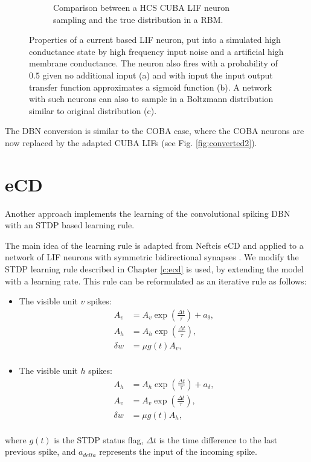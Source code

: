 \begin{figure}
\begin{subfigure}[t]{.5\textwidth}
  		\caption{Comparison between a HCS CUBA LIF neuron sampling and the true distribution in a RBM.}
  		\label{fig:sub2}
	\end{subfigure}
	\caption[Properties of a current based LIF neuron in a high conductance state.]{Properties of a current based LIF neuron, put into a simulated high conductance state by high frequency input noise and a artificial high membrane conductance. The neuron also fires with a probability of $0.5$ given no additional input (a) and with input the input output transfer function approximates a sigmoid function (b). A network with such neurons can also to sample in a Boltzmann distribution similar to original distribution (c).}
	\label{fig:cubahcs}
\end{figure}
The DBN conversion is similar to the COBA case, where the COBA neurons are now replaced by the adapted CUBA LIFs (see Fig. \ref{fig:converted2}).

\section{eCD} \label{c:ecdappr}

Another approach implements the learning of the convolutional spiking DBN with an STDP based learning rule. 

The main idea of the learning rule is adapted from Neftcis eCD and applied to a network of LIF neurons with symmetric bidirectional synapses \cite{Neftci2013}.
We modify the STDP learning rule described in Chapter \ref{c:ecd} is used, by extending the model with a learning rate. 
This rule can be reformulated as an iterative rule as follows:
\begin{itemize}
\item The visible unit $v$ spikes: 
\[
\begin{split}
A_v &= A_v \exp(\frac{\Delta t}{\tau}) + a_{\delta} ,\\
A_h &= A_h \exp(\frac{\Delta t}{\tau}) ,\\
\delta w &= \mu g(t)  A_v  ,\\
\end{split}
\]
\item The visible unit $h$ spikes: 
\[
\begin{split}
A_h &= A_h \exp(\frac{\Delta t}{\tau}) + a_{\delta} ,\\
A_v &= A_v \exp(\frac{\Delta t}{\tau}) ,\\
\delta w &= \mu  g(t) A_h  ,\\
\end{split}
\]
\end{itemize}
where $g(t)$ is the STDP status flag, $\Delta t$ is the time difference to the last previous spike, and $a_{delta}$ represents the input of the incoming spike.


